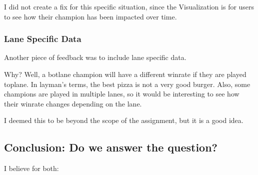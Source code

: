 \documentclass{article}
\begin{document}
I did not create a fix for this specific situation, since the Visualization is 
for users to see how their champion has been impacted over time.

\subsubsection{Lane Specific Data}
\label{subsubsec:Lane Specific Data}

Another piece of feedback was to include lane specific data.

Why? Well, a botlane champion will have a different winrate if they are played toplane. 
In layman's terms, the best pizza is not a very good burger. 
Also, some champions are played in multiple lanes, so it would be interesting to see
how their winrate changes depending on the lane.

I deemed this to be beyond the scope of the assignment, but it is a good idea.

\subsection{Conclusion: Do we answer the question?}
\label{subsec:Conclusion}

I believe for both:



\begin{refcontext}[sorting=nyt]
\printbibliography
\end{refcontext}
\end{document}
